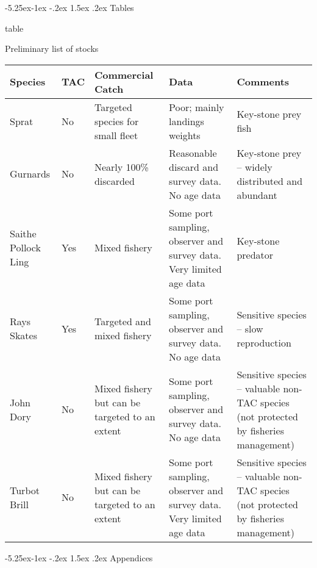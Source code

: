 \documentclass[a4paper, 10pt]{article}
\makeatletter
\renewcommand{\section}{\@startsection{section}{1}{\z@}%
  {-5.25ex\@plus -1ex \@minus -.2ex}%
  {1.5ex \@plus .2ex}%
  {\normalfont\bfseries}}
\makeatother
\begin{document}
\newpage\section{Tables}

\begin{center}
    \caption{table}{Preliminary list of stocks} \label{tab:stocks} 
    \begin{tabular}{ | p{1.61cm} | p{1cm}  | p{3cm} | p{3cm}| p{3cm}|}
    \hline
    Species   & TAC & Commercial Catch & Data & Comments \\ \hline

    Sprat     & No  &Targeted species for small fleet & Poor; mainly landings weights  & Key-stone prey fish\\ \hline
    Gurnards  & No  &Nearly 100\% discarded  & Reasonable discard and survey data. No age data & Key-stone prey – widely distributed and abundant\\ \hline
    Saithe
    Pollock
    Ling      & Yes &Mixed fishery  & Some port sampling, observer and survey data. Very limited age data & Key-stone predator\\ \hline
    Rays 
    Skates    & Yes &Targeted and mixed fishery  & Some port sampling, observer and survey data. No age data & Sensitive species – slow reproduction\\ \hline
    John Dory & No  &Mixed fishery but can be targeted to an extent  & Some port sampling, observer and survey data. No age data & Sensitive species – valuable non-TAC species (not protected by fisheries management)\\ \hline
    Turbot
    Brill     & No  &Mixed fishery but can be targeted to an extent  & Some port sampling, observer and survey data. Very limited age data & Sensitive species – valuable non-TAC species (not protected by fisheries management)\\ \hline
\end{tabular}
\end{center}



\newpage\clearpage


%

\newpage
\begin{center}
\section{Appendices} 
\end{center}
\end{document}
